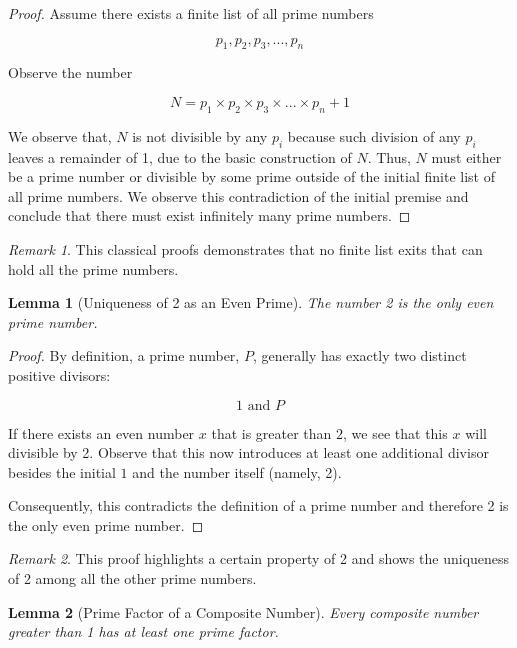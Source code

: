 \documentclass{article}
\theoremstyle{plain}
\newtheorem{lemma}{Lemma}
\theoremstyle{definition}
\theoremstyle{remark}
\newtheorem{remark}{Remark}
\begin{document}
\begin{proof}
    Assume there exists a finite list of all prime numbers

    \[
        p_1, p_2, p_3, ..., p_n
    \]

    Observe the number

    \[
        N = p_1 \times p_2 \times p_3 \times ... \times p_n + 1
    \]

    We observe that, \(N\) is not divisible by any \(p_i\) because such division of any \(p_i\) leaves a remainder of 1, due to the basic construction of \(N\). Thus, \(N\) must either be a prime number or divisible by some prime outside of the initial finite list of all prime numbers. We observe this contradiction of the initial premise and conclude that there must exist infinitely many prime numbers.
\end{proof}

\begin{remark}
	This classical proofs demonstrates that no finite list exits that can hold all the prime numbers.
\end{remark}

\bigskip

\begin{lemma}
    [Uniqueness of 2 as an Even Prime] The number 2 is the only even prime number. 
\end{lemma}

\begin{proof}
    By definition, a prime number, \(P\), generally has exactly two distinct positive divisors:
    
    \[
        1 \text{ and } P
    \]
    
    If there exists an even number \(x\) that is greater than \(2\), we see that this \(x\) will divisible by 2. Observe that this now introduces at least one additional divisor besides the initial \(1\) and the number itself (namely, 2). 

    Consequently, this contradicts the definition of a prime number and therefore 2 is the only even prime number.
\end{proof}

\begin{remark}
    This proof highlights a certain property of 2 and shows the uniqueness of 2 among all the other prime numbers.
\end{remark}

\bigskip

\begin{lemma}
    [Prime Factor of a Composite Number] Every composite number greater than 1 has at least one prime factor. 
\end{lemma}
\end{document}
